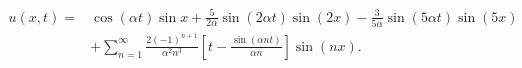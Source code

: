 \[\begin{split}u(x,t)={}&\cos(\alpha t)\sin x+\frac5{2\alpha}\sin(2\alpha t)\sin(2x)-\frac3{5\alpha}\sin(5\alpha t)\sin(5x)\\&+\sum_{n=1}^{\infty}\frac{2(-1)^{n+1}}{\alpha^2n^3}\left[t-\frac{\sin(\alpha nt)}{\alpha n}\right]\sin(nx).\end{split}\]
